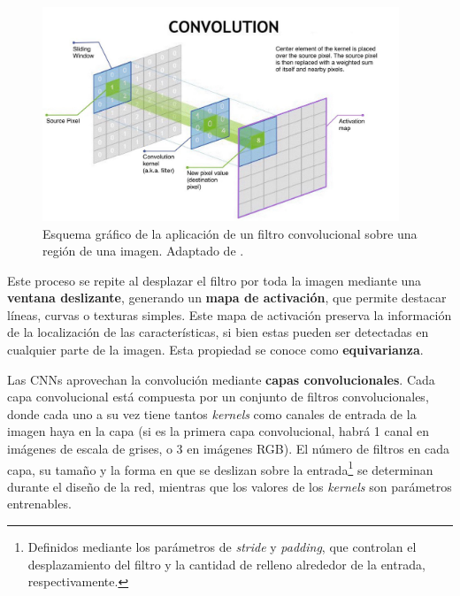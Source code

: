 \begin{figure}[h]
    \centering
    \includegraphics[width=0.95\textwidth]{capitulos/cap_02/imagenes/convolution_operation.jpg}
    \caption[Esquema gráfico de la aplicación de un filtro convolucional sobre una región de una imagen.]{
        Esquema gráfico de la aplicación de un filtro convolucional sobre una región de una imagen.
        Adaptado de \cite{nvidia2025convolutionoperation}.
    } 
    \label{fig:conv_op}
\end{figure}

Este proceso se repite al desplazar el filtro por toda la imagen mediante una \textbf{ventana deslizante}, 
generando un \textbf{mapa de activación}, que permite destacar líneas, curvas o texturas simples. Este mapa de
activación preserva la información de la localización de las características, si bien estas pueden ser 
detectadas en cualquier parte de la imagen. Esta propiedad se conoce como \textbf{equivarianza}. 

Las CNNs aprovechan la convolución mediante \textbf{capas convolucionales}. Cada capa convolucional está
compuesta por un conjunto de filtros convolucionales, donde cada uno a su vez tiene tantos \textit{kernels} 
como canales de entrada de la imagen haya en la capa (si es la primera capa convolucional, habrá 1 canal en 
imágenes de escala de grises, o 3 en imágenes RGB). El número de filtros en cada capa, su tamaño y la forma
en que se deslizan sobre la entrada\footnote{                                                                      
    Definidos mediante los parámetros de \textit{stride} y \textit{padding}, que controlan el desplazamiento       
    del filtro y la cantidad de relleno alrededor de la entrada, respectivamente.
}
se determinan durante el diseño de la red, mientras que los valores de los \textit{kernels} son parámetros 
entrenables.

